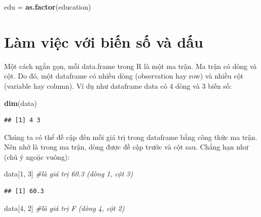 \documentclass[
]{book}
\newenvironment{Shaded}{\begin{snugshade}}{\end{snugshade}}
\newcommand{\CommentTok}[1]{\textcolor[rgb]{0.56,0.35,0.01}{\textit{#1}}}
\newcommand{\DecValTok}[1]{\textcolor[rgb]{0.00,0.00,0.81}{#1}}
\newcommand{\KeywordTok}[1]{\textcolor[rgb]{0.13,0.29,0.53}{\textbf{#1}}}
\newcommand{\NormalTok}[1]{#1}
\newcommand{\StringTok}[1]{\textcolor[rgb]{0.31,0.60,0.02}{#1}}
\begin{document}
\begin{Shaded}
\begin{Highlighting}[]
\NormalTok{edu =}\StringTok{ }\KeywordTok{as.factor}\NormalTok{(education)}
\end{Highlighting}
\end{Shaded}

\hypertarget{luxe0m-viux1ec7c-vux1edbi-biux1ebfn-sux1ed1-vuxe0-dux1ea5u}{%
\section{Làm việc với biến số và dấu}\label{luxe0m-viux1ec7c-vux1edbi-biux1ebfn-sux1ed1-vuxe0-dux1ea5u}}

Một cách ngắn gọn, mỗi data.frame trong R là một ma trận. Ma trận có dòng và cột. Do đó, một dataframe có nhiều dòng (observation hay row) và nhiều cột (variable hay column). Ví dụ như dataframe data có 4 dòng và 3 biến số:

\begin{Shaded}
\begin{Highlighting}[]
\KeywordTok{dim}\NormalTok{(data)}
\end{Highlighting}
\end{Shaded}

\begin{verbatim}
## [1] 4 3
\end{verbatim}

Chúng ta có thể đề cập đến mỗi giá trị trong dataframe bằng công thức ma trận. Nên nhớ là trong ma trận, dòng được đề cập trước và cột sau. Chẳng hạn như (chú ý ngoặc vuông):

\begin{Shaded}
\begin{Highlighting}[]
\NormalTok{data[}\DecValTok{1}\NormalTok{, }\DecValTok{3}\NormalTok{] }\CommentTok{\#là giá trị 60.3 (dòng 1, cột 3)}
\end{Highlighting}
\end{Shaded}

\begin{verbatim}
## [1] 60.3
\end{verbatim}

\begin{Shaded}
\begin{Highlighting}[]
\NormalTok{data[}\DecValTok{4}\NormalTok{, }\DecValTok{2}\NormalTok{] }\CommentTok{\#là giá trị F (dòng 4, cột 2)}
\end{Highlighting}
\end{Shaded}
\end{document}
